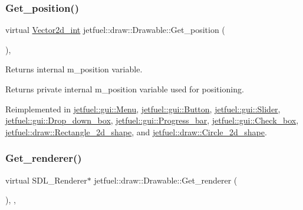 \subsubsection{\texorpdfstring{Get\+\_\+position()}{Get\_position()}}
{\footnotesize\ttfamily virtual \hyperlink{classjetfuel_1_1draw_1_1Vector2d}{Vector2d\+\_\+int} jetfuel\+::draw\+::\+Drawable\+::\+Get\+\_\+position (\begin{DoxyParamCaption}{ }\end{DoxyParamCaption})\hspace{0.3cm}{\ttfamily [inline]}, {\ttfamily [virtual]}}



Returns internal m\+\_\+position variable. 

Returns private internal m\+\_\+position variable used for positioning. 

Reimplemented in \hyperlink{classjetfuel_1_1gui_1_1Menu_ac1aebb753feba17be808f2068ff17e74}{jetfuel\+::gui\+::\+Menu}, \hyperlink{classjetfuel_1_1gui_1_1Button_aadcceacaabaa40bceb293d1f91231d22}{jetfuel\+::gui\+::\+Button}, \hyperlink{classjetfuel_1_1gui_1_1Slider_a2b177c832a42ad21ca1fa88496ef7551}{jetfuel\+::gui\+::\+Slider}, \hyperlink{classjetfuel_1_1gui_1_1Drop__down__box_af92cccd010b21e1ce64af9a3c58ba086}{jetfuel\+::gui\+::\+Drop\+\_\+down\+\_\+box}, \hyperlink{classjetfuel_1_1gui_1_1Progress__bar_a5771ea71b321c173383e89537cea0ae1}{jetfuel\+::gui\+::\+Progress\+\_\+bar}, \hyperlink{classjetfuel_1_1gui_1_1Check__box_a7f14e8be560d0be5a05839442de1f18f}{jetfuel\+::gui\+::\+Check\+\_\+box}, \hyperlink{classjetfuel_1_1draw_1_1Rectangle__2d__shape_a60aa3e0fa050e3fbd98177c1eef721b0}{jetfuel\+::draw\+::\+Rectangle\+\_\+2d\+\_\+shape}, and \hyperlink{classjetfuel_1_1draw_1_1Circle__2d__shape_a99b93544660c7f5b11cf8f0169e8fec1}{jetfuel\+::draw\+::\+Circle\+\_\+2d\+\_\+shape}.

\mbox{\label{classjetfuel_1_1draw_1_1Drawable_a6bbda81a7fbd33c388039ecaeb53c278}} 
\subsubsection{\texorpdfstring{Get\+\_\+renderer()}{Get\_renderer()}}
{\footnotesize\ttfamily virtual S\+D\+L\+\_\+\+Renderer$\ast$ jetfuel\+::draw\+::\+Drawable\+::\+Get\+\_\+renderer (\begin{DoxyParamCaption}{ }\end{DoxyParamCaption})\hspace{0.3cm}{\ttfamily [inline]}, {\ttfamily [protected]}, {\ttfamily [virtual]}}



